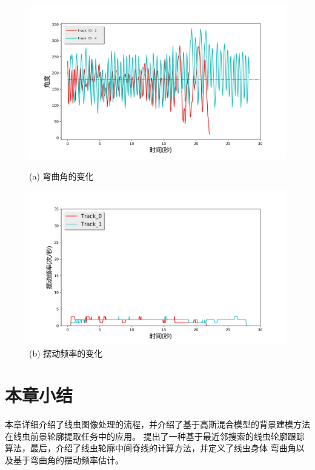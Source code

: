 \begin{figure}[!htp]    
\begin{minipage}[t]{0.5\linewidth}%
	\centering    
	\includegraphics[width=1\linewidth]{figure/chap3/angle.jpg}    
	\caption*{(a) 弯曲角的变化}%
	\label{fig:angle}    
\end{minipage}    
\begin{minipage}[t]{0.5\linewidth}%
	\centering    
	\includegraphics[width=1\linewidth]{figure/chap3/freq.jpg}    
	\caption*{(b) 摆动频率的变化}
	\label{fig:freq}
\end{minipage}
\end{figure}


\section{本章小结}
	本章详细介绍了线虫图像处理的流程，并介绍了基于高斯混合模型的背景建模方法在线虫前景轮廓提取任务中的应用。
	提出了一种基于最近邻搜索的线虫轮廓跟踪算法，最后，介绍了线虫轮廓中间脊线的计算方法，并定义了线虫身体
	弯曲角以及基于弯曲角的摆动频率估计。

